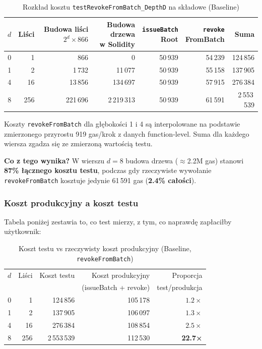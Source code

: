 \documentclass[11pt,a4paper]{article}
\begin{document}
\begin{table}[H]
\centering
\caption{Rozkład kosztu \texttt{testRevokeFromBatch\_DepthD} na składowe (Baseline)}
\begin{tabular}{crrrrrr}
\toprule
\(d\) & Liści & \makecell{Budowa liści\\$2^d \times 866$} & \makecell{Budowa drzewa\\w Solidity} & \makecell{\texttt{issueBatch}\\Root} & \makecell{\texttt{revoke}\\FromBatch} & \textbf{Suma} \\
\midrule
0 & 1   &    866 &         0 & 50\,939 & 54\,239 & 124\,856\phantom{*} \\
1 & 2   &  1\,732 &    11\,077 & 50\,939 & 55\,158 & 137\,905\phantom{*} \\
4 & 16  & 13\,856 &   134\,697 & 50\,939 & 57\,915 & 276\,384\phantom{*} \\
8 & 256 & 221\,696 & 2\,219\,313 & 50\,939 & 61\,591 & 2\,553\,539\phantom{*} \\
\bottomrule
\end{tabular}
\end{table}

\noindent Koszty \texttt{revokeFromBatch} dla głębokości 1 i 4 są interpolowane
na podstawie zmierzonego przyrostu 919 gas/krok z danych function-level.
Suma dla każdego wiersza zgadza się ze zmierzoną wartością testu.

\noindent\textbf{Co z tego wynika?} W wierszu $d=8$ budowa drzewa
($\approx$2.2M gas) stanowi \textbf{87\% łącznego kosztu testu},
podczas gdy rzeczywiste wywołanie \texttt{revokeFromBatch}
kosztuje jedynie 61\,591 gas (\textbf{2.4\% całości}).

\subsubsection*{Koszt produkcyjny a koszt testu}

Tabela poniżej zestawia to, co test mierzy, z tym, co naprawdę zapłaciłby użytkownik:

\begin{table}[H]
\centering
\caption{Koszt testu vs rzeczywisty koszt produkcyjny (Baseline, \texttt{revokeFromBatch})}
\begin{tabular}{crrrr}
\toprule
\(d\) & Liści & Koszt testu & Koszt produkcyjny & Proporcja \\
       &       &             & \small(issueBatch + revoke) & \small test/produkcja \\
\midrule
0 & 1   & 124\,856    & 105\,178 & $1.2\times$ \\
1 & 2   & 137\,905    & 106\,097 & $1.3\times$ \\
4 & 16  & 276\,384    & 108\,854 & $2.5\times$ \\
8 & 256 & 2\,553\,539 & 112\,530 & \textbf{22.7×} \\
\bottomrule
\end{tabular}
\end{table}
\end{document}

